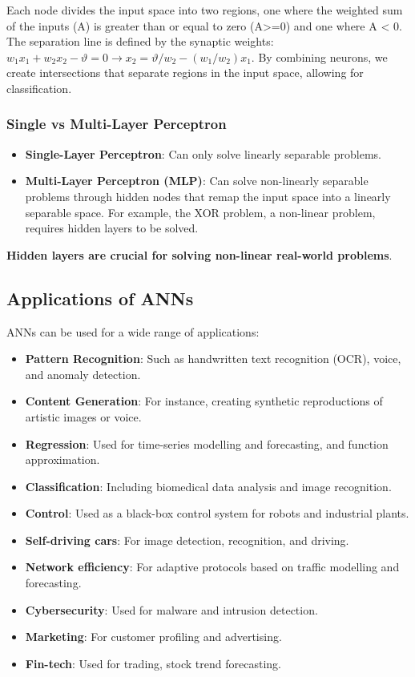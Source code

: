 Each node divides the input space into two regions, one where the weighted sum of the inputs (A) is greater than or equal to zero (A>=0) and one where A < 0. The separation line is defined by the synaptic weights: \(w_1x_1 + w_2x_2 - \vartheta = 0 \rightarrow x_2 = \vartheta / w_2 - (w_1/w_2)x_1\). By combining neurons, we create intersections that separate regions in the input space, allowing for classification.
\subsubsection*{Single vs Multi-Layer Perceptron}
\begin{itemize}
    \item \textbf{Single-Layer Perceptron}: Can only solve linearly separable problems.
    \item \textbf{Multi-Layer Perceptron (MLP)}: Can solve non-linearly separable problems through hidden nodes that remap the input space into a linearly separable space. For example, the XOR problem, a non-linear problem, requires hidden layers to be solved.
\end{itemize}
\textbf{Hidden layers are crucial for solving non-linear real-world problems}.

\subsection*{Applications of ANNs}

ANNs can be used for a wide range of applications:
\begin{itemize}
    \item \textbf{Pattern Recognition}: Such as handwritten text recognition (OCR), voice, and anomaly detection.
    \item \textbf{Content Generation}: For instance, creating synthetic reproductions of artistic images or voice.
    \item \textbf{Regression}: Used for time-series modelling and forecasting, and function approximation.
    \item \textbf{Classification}: Including biomedical data analysis and image recognition.
    \item \textbf{Control}: Used as a black-box control system for robots and industrial plants.
    \item \textbf{Self-driving cars}:  For image detection, recognition, and driving.
    \item \textbf{Network efficiency}:  For adaptive protocols based on traffic modelling and forecasting.
    \item \textbf{Cybersecurity}: Used for malware and intrusion detection.
    \item \textbf{Marketing}:  For customer profiling and advertising.
    \item \textbf{Fin-tech}: Used for trading, stock trend forecasting.
\end{itemize}


